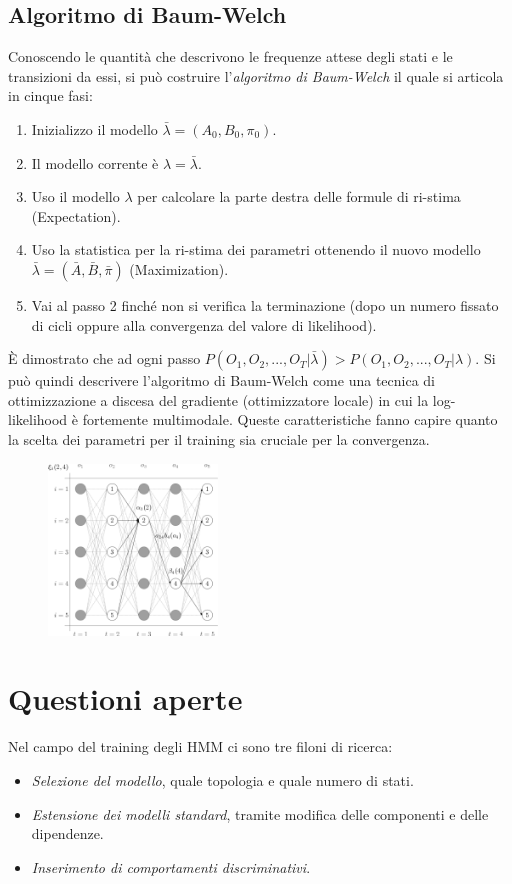 \documentclass[a4paper,oneside,titlepage]{book}
\begin{document}
\subsection{Algoritmo di Baum-Welch}
\label{BW}
Conoscendo le quantità che descrivono le frequenze attese degli stati e le transizioni da essi, si può costruire l'\textit{algoritmo di Baum-Welch} il quale si articola in cinque fasi:
\begin{enumerate}
    \item Inizializzo il modello $\bar{\lambda}=(A_0,B_0,\pi_0)$.
    \item Il modello corrente è $\lambda=\bar{\lambda}$.
    \item Uso il modello $\lambda$ per calcolare la parte destra delle formule di ri-stima (Expectation).
    \item Uso la statistica per la ri-stima dei parametri ottenendo il nuovo modello $\bar{\lambda}=(\bar{A},\bar{B},\bar{\pi})$ (Maximization).
    \item Vai al passo 2 finché non si verifica la terminazione (dopo un numero fissato di cicli oppure alla convergenza del valore di likelihood).
\end{enumerate}
\`{E} dimostrato che ad ogni passo $P(O_1,O_2,...,O_T|\bar{\lambda}) > P(O_1,O_2,...,O_T|\lambda)$. Si può quindi descrivere l'algoritmo di Baum-Welch come una tecnica di ottimizzazione a discesa del gradiente (ottimizzatore locale) in cui la log-likelihood è fortemente multimodale. Queste caratteristiche fanno capire quanto la scelta dei parametri per il training sia cruciale per la convergenza.
\begin{figure}[htp]
	\centering
	\includegraphics[width=0.4\textwidth]{hmm5.png}
\end{figure}

\section{Questioni aperte}
Nel campo del training degli HMM ci sono tre filoni di ricerca:
\begin{itemize}
    \item \textit{Selezione del modello}, quale topologia e quale numero di stati.
    \item \textit{Estensione dei modelli standard}, tramite modifica delle componenti e delle dipendenze.
    \item \textit{Inserimento di comportamenti discriminativi}.
\end{itemize}
\end{document}
